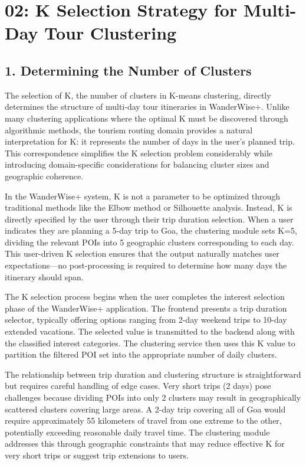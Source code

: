\chapter{02: K Selection Strategy for Multi-Day Tour Clustering}

\section{1. Determining the Number of Clusters}

The selection of K, the number of clusters in K-means clustering, directly determines the structure of multi-day tour itineraries in WanderWise+. Unlike many clustering applications where the optimal K must be discovered through algorithmic methods, the tourism routing domain provides a natural interpretation for K: it represents the number of days in the user's planned trip. This correspondence simplifies the K selection problem considerably while introducing domain-specific considerations for balancing cluster sizes and geographic coherence.

In the WanderWise+ system, K is not a parameter to be optimized through traditional methods like the Elbow method or Silhouette analysis. Instead, K is directly specified by the user through their trip duration selection. When a user indicates they are planning a 5-day trip to Goa, the clustering module sets K=5, dividing the relevant POIs into 5 geographic clusters corresponding to each day. This user-driven K selection ensures that the output naturally matches user expectations—no post-processing is required to determine how many days the itinerary should span.

The K selection process begins when the user completes the interest selection phase of the WanderWise+ application. The frontend presents a trip duration selector, typically offering options ranging from 2-day weekend trips to 10-day extended vacations. The selected value is transmitted to the backend along with the classified interest categories. The clustering service then uses this K value to partition the filtered POI set into the appropriate number of daily clusters.

The relationship between trip duration and clustering structure is straightforward but requires careful handling of edge cases. Very short trips (2 days) pose challenges because dividing POIs into only 2 clusters may result in geographically scattered clusters covering large areas. A 2-day trip covering all of Goa would require approximately 55 kilometers of travel from one extreme to the other, potentially exceeding reasonable daily travel time. The clustering module addresses this through geographic constraints that may reduce effective K for very short trips or suggest trip extensions to users.

